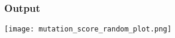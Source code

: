   \begin{frame}
    \frametitle{Output}
    \centering
    \texttt{[image: mutation\_score\_random\_plot.png]}
  \end{frame}
